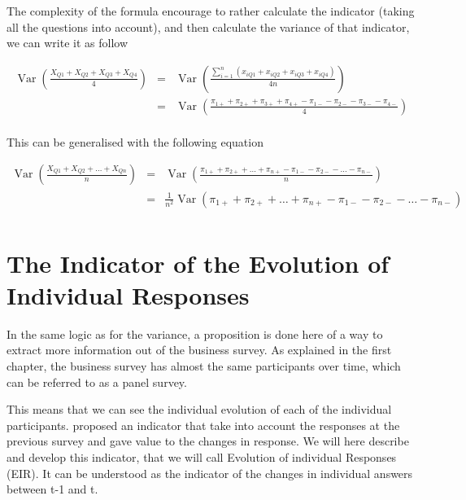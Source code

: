 \documentclass[12pt,a4paper,oneside]{book}
\DeclareMathOperator{\Var}{Var}
\begin{document}
The complexity of the formula encourage to rather calculate the indicator (taking all the questions into account), and then calculate the variance of that indicator, we can write it as follow

\begin{eqnarray}
    \Var \left(\frac{X_{Q1} + X_{Q2} + X_{Q3} + X_{Q4}}{4} \right) 
    &=& \Var \left(\frac{\sum_{i=1}^n \left(x_{i Q1} + x_{i Q2} + x_{i Q3} + x_{i Q4} \right)}{4n} \right) \nonumber \\
    &=& \Var \left(\frac{\pi_{1+} + \pi_{2+} + \pi_{3+} + \pi_{4+} - \pi_{1-} - \pi_{2-} - \pi_{3-} - \pi_{4-} }{4} \right) \nonumber \\
\end{eqnarray}

This can be generalised with the following equation

\begin{eqnarray}
    \Var \left(\frac{X_{Q1} + X_{Q2} + \ldots + X_{Qn}}{n} \right) 
    &=& \Var \left(\frac{\pi_{1+} + \pi_{2+} + \ldots + \pi_{n+} - \pi_{1-} - \pi_{2-} - \ldots - \pi_{n-} }{n} \right) \nonumber \\
    &=& \frac{1}{n^2} \Var \left(\pi_{1+} + \pi_{2+} + \ldots + \pi_{n+} - \pi_{1-} - \pi_{2-} - \ldots - \pi_{n-} \right) \nonumber \\
\end{eqnarray}

\chapter{The Indicator of the Evolution of Individual Responses}

In the same logic as for the variance, a proposition is done here of a way to extract more information out of the business survey. 
As explained in the first chapter, the business survey has almost the same participants over time, which can be referred to as a panel survey.


This means that we can see the individual evolution of each of the individual participants. \cite{caron_estimation_1996} proposed an indicator that take into account the responses at the previous survey and gave value to the changes in response.
We will here describe and develop this indicator, that we will call Evolution of individual Responses (EIR).
It can be understood as the indicator of the changes in individual answers between t-1 and t.
\end{document}
